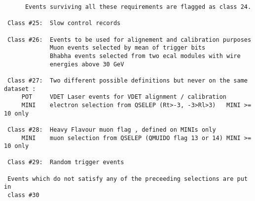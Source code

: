 \begin{verbatim}
      Events surviving all these requirements are flagged as class 24.
 
 Class #25:  Slow control records
 
 Class #26:  Events to be used for alignement and calibration purposes
             Muon events selected by mean of trigger bits
             Bhabha events selected from two ecal modules with wire
             energies above 30 GeV
 
 Class #27:  Two different possible definitions but never on the same dataset :
     POT     VDET Laser events for VDET alignment / calibration
     MINI    electron selection from QSELEP (Rt>-3, -3>Rl>3)   MINI >= 10 only
 
 Class #28:  Heavy Flavour muon flag , defined on MINIs only
     MINI    muon selection from QSELEP (QMUIDO flag 13 or 14) MINI >= 10 only
 
 Class #29:  Random trigger events
 
 Events which do not satisfy any of the preceeding selections are put in
 class #30
 
\end{verbatim}

\newpage
 
